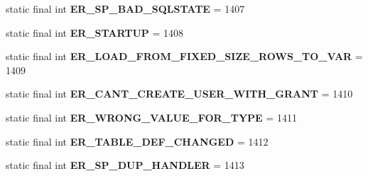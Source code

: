 \begin{DoxyCompactItemize}
\item 
\mbox{\label{classcom_1_1mysql_1_1cj_1_1exceptions_1_1_mysql_error_numbers_a1b3848db6c57958b849395064d350571}} 
static final int {\bfseries E\+R\+\_\+\+S\+P\+\_\+\+B\+A\+D\+\_\+\+S\+Q\+L\+S\+T\+A\+TE} = 1407
\item 
\mbox{\label{classcom_1_1mysql_1_1cj_1_1exceptions_1_1_mysql_error_numbers_aa9eb5e81a5bfdb921b66d5236e2bb266}} 
static final int {\bfseries E\+R\+\_\+\+S\+T\+A\+R\+T\+UP} = 1408
\item 
\mbox{\label{classcom_1_1mysql_1_1cj_1_1exceptions_1_1_mysql_error_numbers_a5082e7f07fbc9e98e306f5d40a6222a1}} 
static final int {\bfseries E\+R\+\_\+\+L\+O\+A\+D\+\_\+\+F\+R\+O\+M\+\_\+\+F\+I\+X\+E\+D\+\_\+\+S\+I\+Z\+E\+\_\+\+R\+O\+W\+S\+\_\+\+T\+O\+\_\+\+V\+AR} = 1409
\item 
\mbox{\label{classcom_1_1mysql_1_1cj_1_1exceptions_1_1_mysql_error_numbers_a0eb1c0884d0343ea623554a757baa5d2}} 
static final int {\bfseries E\+R\+\_\+\+C\+A\+N\+T\+\_\+\+C\+R\+E\+A\+T\+E\+\_\+\+U\+S\+E\+R\+\_\+\+W\+I\+T\+H\+\_\+\+G\+R\+A\+NT} = 1410
\item 
\mbox{\label{classcom_1_1mysql_1_1cj_1_1exceptions_1_1_mysql_error_numbers_ae886487fd7c95d441d97f8f0375feccb}} 
static final int {\bfseries E\+R\+\_\+\+W\+R\+O\+N\+G\+\_\+\+V\+A\+L\+U\+E\+\_\+\+F\+O\+R\+\_\+\+T\+Y\+PE} = 1411
\item 
\mbox{\label{classcom_1_1mysql_1_1cj_1_1exceptions_1_1_mysql_error_numbers_a6396557dfc842f2fda91c8c1a07d5ade}} 
static final int {\bfseries E\+R\+\_\+\+T\+A\+B\+L\+E\+\_\+\+D\+E\+F\+\_\+\+C\+H\+A\+N\+G\+ED} = 1412
\item 
\mbox{\label{classcom_1_1mysql_1_1cj_1_1exceptions_1_1_mysql_error_numbers_aefd6efa2fa3ce6f6224d09856fdb4010}} 
static final int {\bfseries E\+R\+\_\+\+S\+P\+\_\+\+D\+U\+P\+\_\+\+H\+A\+N\+D\+L\+ER} = 1413

\end{DoxyCompactItemize}
